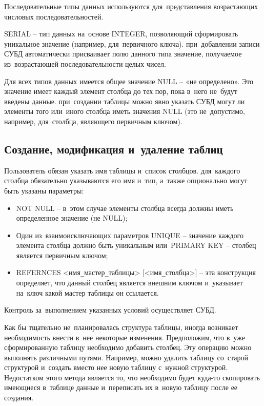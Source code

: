 \documentclass{ou}
\begin{document}
Последовательные типы данных используются для~представления возрастающих числовых последовательностей. 

SERIAL -- тип данных на~основе INTEGER, позволяющий сформировать уникальное значение (например, для~первичного ключа). при~добавлении записи СУБД автоматически присваивает полю данного типа значение, получаемое из~возрастающей последовательности целых чисел. 

Для всех типов данных имеется общее значение NULL -- «не определено». Это значение имеет каждый элемент столбца до тех пор, пока в~него не~будут введены данные. при~создании таблицы можно явно указать СУБД могут ли элементы того или~иного столбца иметь значения NULL (это не~допустимо, например, для~столбца, являющего первичным ключом). 
\subsection{Создание, модификация и~удаление таблиц}
Пользователь обязан указать имя таблицы и~список столбцов. для~каждого столбца обязательно указываются его имя и~тип, а~также опционально могут быть указаны параметры: 
\begin{itemize}[label=-, itemindent=4em, nosep]
\item NOT NULL -- в~этом случае элементы столбца всегда должны иметь определенное значение (не NULL);
\item Один из~взаимоисключающих параметров UNIQUE -- значение каждого элемента столбца должно быть уникальным или~PRIMARY KEY -- столбец является первичным ключом;
\item REFERNCES <имя\verb|_|мастер\verb|_|таблицы> [<имя\verb|_|столбца>] -- эта конструкция определяет, что данный столбец является внешним ключом и~указывает на~ключ какой мастер таблицы он ссылается.
\end{itemize}

Контроль за~выполнением указанных условий осуществляет СУБД.

Как бы тщательно не~планировалась структура таблицы, иногда возникает необходимость внести в~нее некоторые изменения. Предположим, что в~уже сформированную таблицу необходимо добавить столбец. Эту операцию можно выполнять различными путями. Например, можно удалить таблицу со~старой структурой и~создать вместо нее новую таблицу с~нужной структурой. Недостатком этого метода является то, что необходимо будет куда-то скопировать имеющиеся в~таблице данные и~переписать их в~новую таблицу после ее создания. 
\end{document}
